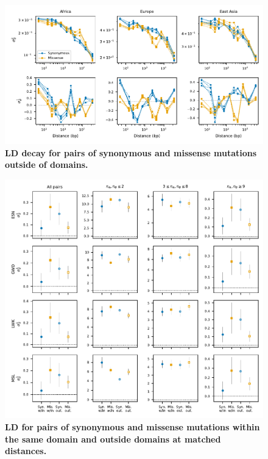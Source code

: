 \documentclass[]{article}
\begin{document}
\begin{figure}[ht!]
    \centering
    \includegraphics{../figures/ld_decay_outside_domains}
    \caption{
        \textbf{LD decay for pairs of synonymous and missense mutations
        outside of domains.}
    }
    \label{fig:LDoutside}
\end{figure}

\begin{figure}[ht!]
    \centering
    \includegraphics{../figures/data_domains_afr}
    \caption{
        \textbf{LD for pairs of synonymous and missense mutations within the
        same domain and outside domains at matched distances.}
    }
    \label{fig:domainsAFR}
\end{figure}
\end{document}
